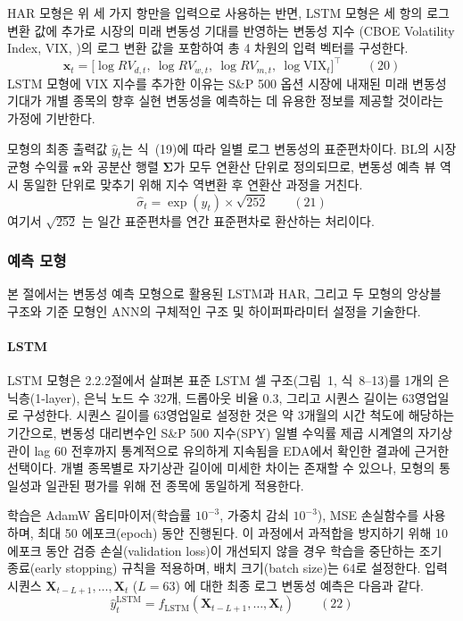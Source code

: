 \documentclass{article}
\begin{document}
HAR 모형은 위 세 가지 항만을 입력으로 사용하는 반면, LSTM 모형은 세 항의 로그 변환 값에 추가로 시장의 미래 변동성 기대를 반영하는 변동성 지수 (CBOE Volatility Index, VIX, \citealp{whaley2009understanding})의 로그 변환 값을 포함하여 총 4 차원의 입력 벡터를 구성한다.
\begin{equation}
\mathbf{x}_t = \bigl[\log RV_{d,t},\ \log RV_{w,t},\ \log RV_{m,t},\
\log \text{VIX}_t\bigr]^\top \qquad(20)\end{equation}
LSTM 모형에 VIX 지수를 추가한 이유는 S\&P 500 옵션 시장에 내재된 미래 변동성 기대가 개별 종목의 향후 실현 변동성을 예측하는 데 유용한 정보를 제공할 것이라는 가정에 기반한다.

모형의 최종 출력값 $\hat{y}_t$는 식~(19)에 따라 일별 로그 변동성의 표준편차이다. BL의 시장 균형 수익률 $\boldsymbol{\pi}$와 공분산 행렬 $\boldsymbol{\Sigma}$가 모두 연환산 단위로 정의되므로, 변동성 예측 뷰 역시 동일한 단위로 맞추기 위해 지수 역변환 후 연환산 과정을 거친다.
\begin{equation}
\hat{\sigma}_t = \exp(\hat{y}_t) \times \sqrt{252} \qquad(21)\end{equation}
여기서 $\sqrt{252}$ 는 일간 표준편차를 연간 표준편차로 환산하는 처리이다.

\subsubsection{예측 모형}

본 절에서는 변동성 예측 모형으로 활용된 LSTM과 HAR, 그리고 두 모형의 앙상블 구조와 기준 모형인 ANN의 구체적인 구조 및 하이퍼파라미터 설정을 기술한다.

\paragraph{LSTM}
LSTM 모형은 2.2.2절에서 살펴본 표준 LSTM 셀 구조(그림~1, 식~8--13)를 1개의 은닉층(1-layer), 은닉 노드 수 32개, 드롭아웃 비율 0.3, 그리고 시퀀스 길이는 63영업일로 구성한다. 시퀀스 길이를 63영업일로 설정한 것은 약 3개월의 시간 척도에 해당하는 기간으로, 변동성 대리변수인 S\&P 500 지수(SPY) 일별 수익률 제곱 시계열의 자기상관이 lag 60 전후까지 통계적으로 유의하게 지속됨을 EDA에서 확인한 결과에 근거한 선택이다. 개별 종목별로 자기상관 길이에 미세한 차이는 존재할 수 있으나, 모형의 통일성과 일관된 평가를 위해 전 종목에 동일하게 적용한다.

학습은 AdamW 옵티마이저(학습률 $10^{-3}$, 가중치 감쇠 $10^{-3}$), MSE 손실함수를 사용하며, 최대 50 에포크(epoch) 동안 진행된다. 이 과정에서 과적합을 방지하기 위해 10 에포크 동안 검증 손실(validation loss)이 개선되지 않을 경우 학습을 중단하는 조기 종료(early stopping) 규칙을 적용하며, 배치 크기(batch size)는 64로 설정한다. 입력 시퀀스 $\mathbf{X}_{t-L+1}, \ldots, \mathbf{X}_t$ ($L=63$) 에 대한 최종 로그 변동성 예측은 다음과 같다.
\begin{equation}
\hat{y}^{\text{LSTM}}_t = f_{\text{LSTM}}(\mathbf{X}_{t-L+1}, \ldots,
\mathbf{X}_t) \qquad(22)\end{equation}
\end{document}
